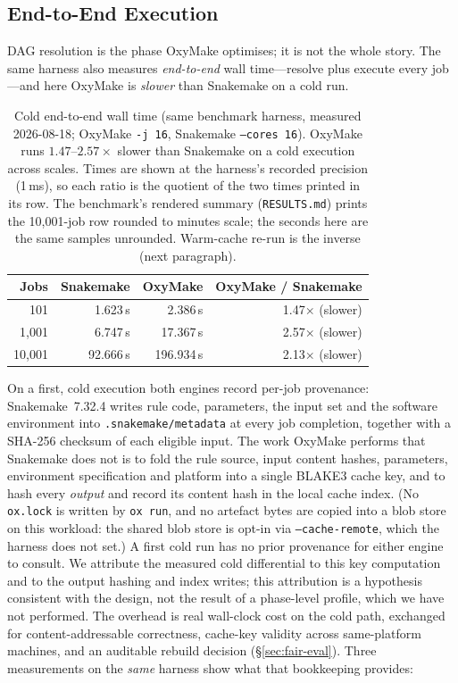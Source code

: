 \documentclass[12pt,a4paper]{article}
\newcommand{\code}[1]{{\texttt{\small\color{inlinecode}#1}}}
\begin{document}
\subsection{End-to-End Execution}
\label{sec:e2e-bench}

DAG resolution is the phase OxyMake optimises; it is not the whole story. The
same harness also measures \emph{end-to-end} wall time---resolve plus execute
every job---and here OxyMake is \emph{slower} than Snakemake on a cold run.

\begin{table}[htbp]
\centering\small
\begin{tabular}{@{}rrrr@{}}
\toprule
\textbf{Jobs} & \textbf{Snakemake} & \textbf{OxyMake} & \textbf{OxyMake / Snakemake} \\
\midrule
101      &   1.623\,s  &    2.386\,s  & 1.47$\times$ (slower) \\
1{,}001  &   6.747\,s  &   17.367\,s  & 2.57$\times$ (slower) \\
10{,}001 &  92.666\,s  &  196.934\,s  & 2.13$\times$ (slower) \\
\bottomrule
\end{tabular}
\caption{Cold end-to-end wall time (same benchmark harness, measured
  2026-08-18; OxyMake \code{-j 16}, Snakemake \code{--cores 16}).
  OxyMake runs
  $1.47$--$2.57\times$ slower than Snakemake on a cold execution across scales.
  Times are shown at the harness's recorded precision (1\,ms), so each
  ratio is the quotient of the two times printed in its row. The
  benchmark's rendered summary (\code{RESULTS.md}) prints the
  10{,}001-job row rounded to minutes scale;
  the seconds here are the same samples unrounded.
  Warm-cache re-run is the inverse (next paragraph).}
\label{tab:e2e}
\end{table}

\noindent On a first, cold execution both engines record per-job
provenance: Snakemake~7.32.4 writes rule code, parameters, the input
set and the software environment into \code{.snakemake/metadata} at
every job completion, together with a SHA-256 checksum of each eligible
input. The work OxyMake performs that Snakemake does not is to fold the
rule source, input content hashes, parameters, environment
specification and platform into a single BLAKE3 cache key, and to hash
every \emph{output} and record its content hash in the local cache
index. (No \code{ox.lock} is written by \code{ox run}, and no artefact
bytes are copied into a blob store on this workload: the shared blob
store is opt-in via \code{--cache-remote}, which the harness does not
set.) A first cold run has no prior
provenance for either engine to consult. We attribute the measured
cold differential to this key computation and to the output hashing and
index writes; this
attribution is a hypothesis consistent with the design, not the result
of a phase-level profile, which we have not performed. The overhead is
real wall-clock cost on the cold path,
exchanged for content-addressable correctness, cache-key validity
across same-platform machines, and an auditable rebuild decision
(\S\ref{sec:fair-eval}). Three measurements on the \emph{same} harness
show what that bookkeeping provides:
\end{document}
